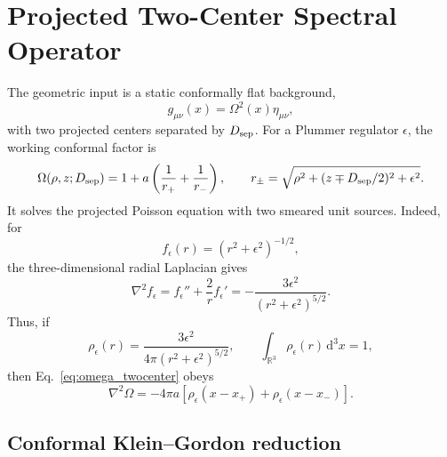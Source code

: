 \documentclass[aps,prd,onecolumn,notitlepage,nofootinbib,superscriptaddress,11pt,floatfix]{revtex4-2}
\newcommand{\dd}{\mathrm{d}}
\newcommand{\Dsep}{D_{\rm sep}}
\begin{document}
\section{Projected Two-Center Spectral Operator}
\label{sec:operator}

The geometric input is a static conformally flat background,
\begin{equation}
    g_{\mu\nu}(x)=\Omega^2(x)\eta_{\mu\nu},
\end{equation}
with two projected centers separated by \(\Dsep\).
For a Plummer regulator \(\epsilon\), the working conformal factor is
\begin{equation}
    \Omega(\rho,z;\Dsep)=1+a\left(\frac{1}{r_+}+\frac{1}{r_-}\right),\qquad
    r_\pm=\sqrt{\rho^2+(z\mp \Dsep/2)^2+\epsilon^2}.
    \label{eq:omega_twocenter}
\end{equation}
It solves the projected Poisson equation with two smeared unit sources.
Indeed, for
\begin{equation}
    f_\epsilon(r)=(r^2+\epsilon^2)^{-1/2},
\end{equation}
the three-dimensional radial Laplacian gives
\begin{equation}
    \nabla^2 f_\epsilon
    =f_\epsilon''+\frac{2}{r}f_\epsilon'
    =-\frac{3\epsilon^2}{(r^2+\epsilon^2)^{5/2}}.
    \label{eq:plummer_laplacian}
\end{equation}
Thus, if
\begin{equation}
    \rho_\epsilon(r)=\frac{3\epsilon^2}{4\pi(r^2+\epsilon^2)^{5/2}},
    \qquad
    \int_{\mathbb R^3}\rho_\epsilon(r)\,\dd^3x=1,
\end{equation}
then Eq.~\eqref{eq:omega_twocenter} obeys
\begin{equation}
    \nabla^2\Omega
    =
    -4\pi a\left[
        \rho_\epsilon(x-x_+)+\rho_\epsilon(x-x_-)
    \right].
    \label{eq:projected_poisson}
\end{equation}

\subsection{Conformal Klein--Gordon reduction}
\end{document}
